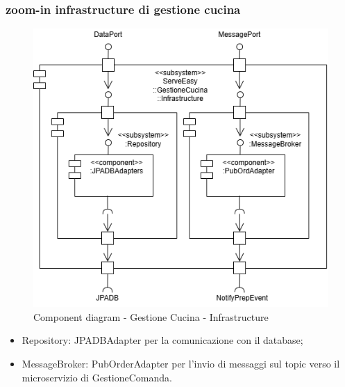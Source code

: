 \subsubsection{zoom-in infrastructure di gestione cucina}
\begin{figure}[H]
	\centering
	\includegraphics[scale=0.5]{iterazione1/images/component_comanda_cucina-GestioneCucina__Infrastructure.jpg}
	\caption{Component diagram - Gestione Cucina - Infrastructure \label{fig:component_diagram_gestione_cucina_infrastructure}}
\end{figure}
\begin{itemize}
    \item Repository: JPADBAdapter per la comunicazione con il database;
    \item MessageBroker: PubOrderAdapter per l'invio di messaggi sul topic verso il microservizio di GestioneComanda.
\end{itemize}


